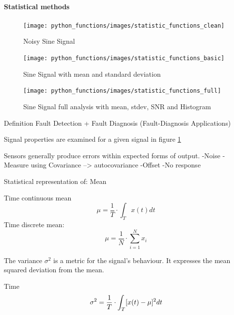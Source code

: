 \paragraph{Statistical methods}




\cite{smith_scientist_nodate}
\begin{figure}[h]
    \centering
    \texttt{[image: python\_functions/images/statistic\_functions\_clean]}
    \caption{Noisy Sine Signal}
    \label{fig:statistics_clean}
\end{figure}
\begin{figure}[h]
    \centering
    \texttt{[image: python\_functions/images/statistic\_functions\_basic]}
    \caption{Sine Signal with mean and standard deviation}
    \label{fig:statistics_basic}
\end{figure}
\begin{figure}[h]
    \centering
    \texttt{[image: python\_functions/images/statistic\_functions\_full]}
    \caption{Sine Signal full analysis with mean, stdev, SNR and Histogram}
    \label{fig:statistics_full}
\end{figure}


Definition Fault Detection + Fault Diagnosis (Fault-Diagnosis Applications)


Signal properties are examined for a given signal in figure \ref{fig:statistics_clean}





Sensors generally produce errors within expected forms of output. -Noise -Measure using Covariance --> autocovariance -Offset -No response

Statistical representation of: Mean

\cite[S.13-17]{smith_scientist_nodate}

Time continuous mean
\begin{equation}
    \label{eq:mean_cont}
    \mu=\frac{1}{T} \cdot \int_T x(t) d t
\end{equation}
Time discrete mean:
\begin{equation}
    \label{eq:mean_disc}
    \mu=\frac{1}{N} \cdot \sum_{i=1}^{N} x_i
\end{equation}




The variance $\sigma^2$ is a metric for the signal's behaviour. It expresses the mean squared deviation from the mean.

Time
\begin{equation}
    \label{eq:var_cont}
    \sigma^2=\frac{1}{T} \cdot \int_T[x(t)-\mu]^2 d t\\
\end{equation}

